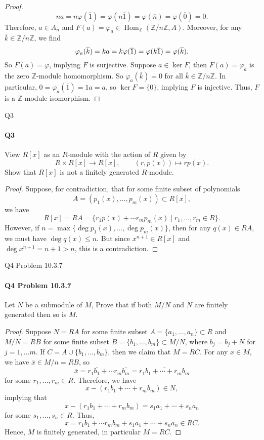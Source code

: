 \documentclass[12pt]{article}
\newenvironment{fullbox}{\begin{lrbox}{\savefullbox}\begin{minipage}{\dimexpr\textwidth-2\fboxsep\relax}}{\end{minipage}\end{lrbox}\begin{center}\framebox[\textwidth]{\usebox{\savefullbox}}\end{center}}
\newenvironment{pbox}[1][]{\begin{fullbox}\ifx#1\empty\else\paragraph{#1}\fi}{\end{fullbox}}
\theoremstyle{definition}
\newcommand{\Z}{\mathbb{Z}}
\renewcommand{\phi}{\varphi}
\newcommand{\eqc}{\overline}
\newcommand{\Hom}{\operatorname{Hom}}
\begin{document}
\begin{proof}
    \[
        na
            = n\phi(\eqc{1})
            = \phi(n\eqc{1})
            = \phi(\eqc{n})
            = \phi(\eqc{0})
            = 0.
    \]
    Therefore, $a \in A_n$ and $F(a) = \phi_a \in \Hom_\Z(\Z/n\Z, A)$. Moreover, for any $\eqc{k} \in \Z/n\Z$, we find
    \[
        \phi_a(\eqc{k})
            = ka
            = k\phi(\eqc{1}) \\
            = \phi(k\eqc{1}) \\
            = \phi(\eqc{k}).
    \]
    So $F(a) = \phi$, implying $F$ is surjective. Suppose $a \in \ker F$, then $F(a) = \phi_a$ is the zero $\Z$-module homomorphism. So $\phi_a(\eqc{k}) = 0$ for all $\eqc{k} \in \Z/n\Z$. In particular, $0 = \phi_a(\eqc{1}) = 1a = a$, so $\ker F = \{0\}$, implying $F$ is injective. Thus, $F$ is a $\Z$-module isomorphism.
    
\end{proof}


\newpage
\begin{pbox}[Q3]
    View $R[x]$ as an $R$-module with the action of $R$ given by
    \[
        R \times R[x] \to R[x], \qquad (r, p(x)) \mapsto rp(x).
    \]
    Show that $R[x]$ is not a finitely generated $R$-module.
\end{pbox}

\begin{proof}
    Suppose, for contradiction, that for some finite subset of polynomials
    \[
        A = (p_1(x), \dots, p_m(x)) \subset R[x],
    \]
    we have
    \[
        R[x] = RA = \{r_1p(x) + \cdots r_mp_m(x) \mid r_1, \dots, r_m \in R\}.
    \]
    However, if $n = \max\{\deg p_1(x), \dots, \deg p_m(x)\}$, then for any $q(x) \in RA$, we must have $\deg q(x) \leq n$. But since $x^{n+1} \in R[x]$ and $\deg x^{n+1} = n+1 > n$, this is a contradiction.
    
    
\end{proof}


\begin{pbox}[Q4 Problem 10.3.7]
    Let $N$ be a submodule of $M$, Prove that if both $M/N$ and $N$ are finitely generated then so is $M$.
\end{pbox}

\begin{proof}
    Suppose $N = RA$ for some finite subset $A = \{a_1, \dots, a_n\} \subset R$ and $M/N = RB$ for some finite subset $B = \{\eqc{b_1}, \dots, \eqc{b_m}\} \subset M/N$, where $\eqc{b_j} = b_j + N$ for $j = 1, \dots m$. If $C = A \cup \{b_1, \dots, b_m\}$, then we claim that $M = RC$. For any $x \in M$, we have $\eqc{x} \in M/n = RB$, so
    \[
        \eqc{x}
            = r_1\eqc{b_1} + \cdots r_m\eqc{b_m}
            = \eqc{r_1b_1 + \cdots + r_mb_m}
    \]
    for some $r_1, \dots, r_m \in R$. Therefore, we have
    \[
        x - (r_1b_1 + \cdots + r_mb_m) \in N,
    \]
    implying that
    \[
        x - (r_1b_1 + \cdots + r_mb_m) = s_1a_1 + \cdots + s_na_n
    \]
    for some $s_1, \dots, s_n \in R$. Thus,
    \[
        x = r_1b_1 + \cdots r_mb_m + s_1a_1 + \cdots + s_na_n \in RC.
    \]
    Hence, $M$ is finitely generated, in particular $M = RC$.
    
\end{proof}
\end{document}
